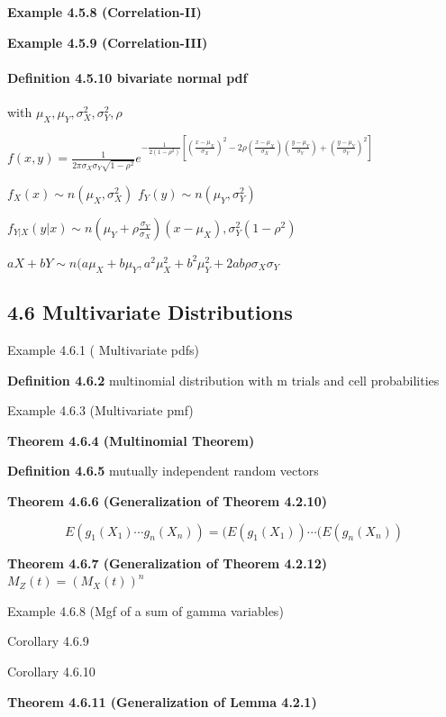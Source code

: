 \documentclass[6pt,Portrait]{article}
\let\oldparagraph\paragraph
\renewcommand{\paragraph}[1]{\oldparagraph{#1}\mbox{}}
\begin{document}
\textbf{Example 4.5.8 (Correlation-II)}

\textbf{Example 4.5.9 (Correlation-III)}

\hypertarget{definition-4.5.10-bivariate-normal-pdf}{%
\paragraph{\texorpdfstring{\textbf{Definition 4.5.10} bivariate normal
pdf}{Definition 4.5.10 bivariate normal pdf}}\label{definition-4.5.10-bivariate-normal-pdf}}

with \(\mu_X,\mu_Y,\sigma_X^2,\sigma_Y^2, \rho\)

\(f(x,y)=\frac{1}{2\pi\sigma_X\sigma_Y\sqrt{1-\rho^2}}e^{-\frac{1}{2(1-\rho^2)}[(\frac{x-\mu_X}{\sigma_X})^2-2\rho(\frac{x-\mu_X}{\sigma_X})(\frac{y-\mu_Y}{\sigma_Y})+(\frac{y-\mu_Y}{\sigma_Y})^2]}\)

\(f_X(x)\sim n(\mu_X,\sigma^2_X)\) \(f_Y(y)\sim n(\mu_Y,\sigma^2_Y)\)

\(f_{Y|X}(y|x) \sim n(\mu_Y+\rho\frac{\sigma_Y}{\sigma_X})(x-\mu_X),\sigma_Y^2(1-\rho^2)\)

\(aX+bY\sim n(a\mu_X+b\mu_Y,a^2\mu_X^2+b^2\mu_Y^2+2ab\rho\sigma_X\sigma_Y\)

\hypertarget{multivariate-distributions}{%
\subsection{4.6 Multivariate
Distributions}\label{multivariate-distributions}}

Example 4.6.1 ( Multivariate pdfs)

\textbf{Definition 4.6.2} multinomial distribution with m trials and
cell probabilities

Example 4.6.3 (Multivariate pmf)

\textbf{Theorem 4.6.4 (Multinomial Theorem)}

\textbf{Definition 4.6.5} mutually independent random vectors

\textbf{Theorem 4.6.6 (Generalization of Theorem 4.2.10)}

\[E(g_1(X_1)\cdots g_n(X_n))=(E(g_1(X_1))\cdots(E(g_n(X_n))\]

\textbf{Theorem 4.6.7 (Generalization of Theorem 4.2.12)}
\(M_Z(t)=(M_X(t))^n\)

Example 4.6.8 (Mgf of a sum of gamma variables)

Corollary 4.6.9

Corollary 4.6.10

\textbf{Theorem 4.6.11 (Generalization of Lemma 4.2.1)}
\end{document}
